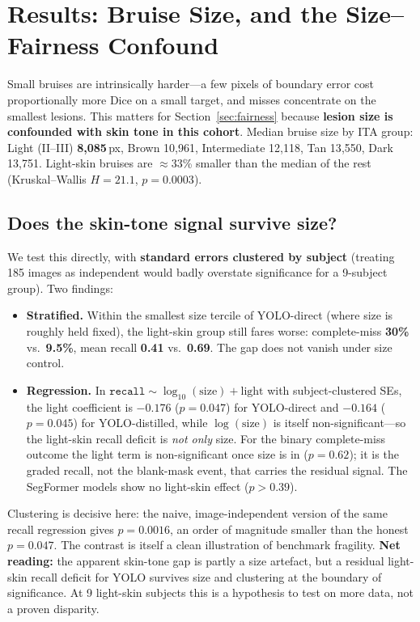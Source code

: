 \documentclass[11pt]{article}
\begin{document}
\section{Results: Bruise Size, and the Size--Fairness Confound}
Small bruises are intrinsically harder---a few pixels of boundary error cost
proportionally more Dice on a small target, and misses concentrate on the
smallest lesions. This matters for Section~\ref{sec:fairness} because
\textbf{lesion size is confounded with skin tone in this cohort}. Median bruise
size by ITA group: Light (II--III) \textbf{8{,}085}\,px, Brown 10{,}961, Intermediate
12{,}118, Tan 13{,}550, Dark 13{,}751. Light-skin bruises are $\approx$33\% smaller
than the median of the rest (Kruskal--Wallis $H=21.1$, $p=0.0003$).

\subsection{Does the skin-tone signal survive size?}
We test this directly, with \textbf{standard errors clustered by subject}
(treating 185 images as independent would badly overstate significance for a
9-subject group). Two findings:

\begin{itemize}[leftmargin=1.4em]
\item \textbf{Stratified.} Within the smallest size tercile of YOLO-direct
      (where size is roughly held fixed), the light-skin group still fares worse:
      complete-miss \textbf{30\%} vs.\ \textbf{9.5\%}, mean recall \textbf{0.41}
      vs.\ \textbf{0.69}. The gap does not vanish under size control.
\item \textbf{Regression.} In $\texttt{recall} \sim \log_{10}(\text{size}) +
      \text{light}$ with subject-clustered SEs, the light coefficient is
      $-0.176$ ($p=0.047$) for YOLO-direct and $-0.164$ ($p=0.045$) for
      YOLO-distilled, while $\log(\text{size})$ is itself non-significant---so the
      light-skin recall deficit is \emph{not only} size. For the binary
      complete-miss outcome the light term is non-significant once size is in
      ($p=0.62$); it is the graded recall, not the blank-mask event, that carries
      the residual signal. The SegFormer models show no light-skin effect
      ($p>0.39$).
\end{itemize}

Clustering is decisive here: the naive, image-independent version of the same
recall regression gives $p=0.0016$, an order of magnitude smaller than the honest
$p=0.047$. The contrast is itself a clean illustration of benchmark fragility.
\textbf{Net reading:} the apparent skin-tone gap is partly a size artefact, but a
residual light-skin recall deficit for YOLO survives size and clustering at the
boundary of significance. At 9 light-skin subjects this is a hypothesis to test on
more data, not a proven disparity.
\end{document}
